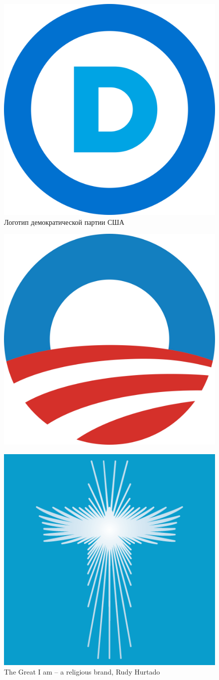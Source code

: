 \begin{figure}[h]
  \centering
  \includegraphics[width=.5\linewidth]{images/democrats}
  \caption{Логотип демократической партии США}
  \label{fig:democrats}
\end{figure}

\begin{figure}[h]
  \centering
  \includegraphics[width=.5\linewidth]{images/obama}
  \caption{}  %
  \label{fig:obama}
\end{figure}

\begin{figure}[h]
  \centering
  \includegraphics[width=.5\linewidth]{images/cross1}
  \caption{The Great I am -- a religious brand, Rudy Hurtado}
  \label{fig:cross1}
\end{figure}

